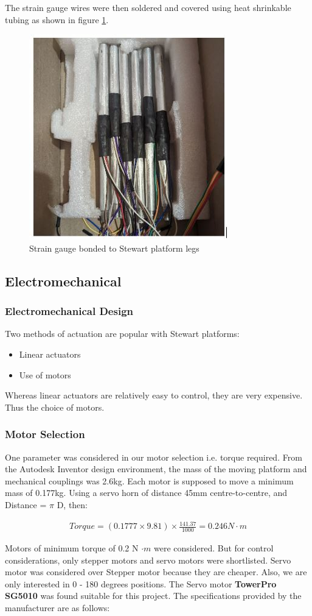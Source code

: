 The strain gauge wires were then soldered and covered using heat shrinkable tubing as shown in figure 
\ref{shrink}.
\begin{center}
	\begin{figure}[H]
	\centering
	\includegraphics[width=0.5\linewidth]{Figures/shrinkable1.JPG}
	\caption[Full assembly]{Strain gauge bonded to Stewart platform legs}
	\label{shrink}
	\end{figure}
\end{center}
\subsection{Electromechanical}
\subsubsection{Electromechanical Design}
Two methods of actuation are popular with Stewart platforms:
\begin{itemize}
\item Linear actuators
\item Use of motors
\end{itemize}
Whereas linear actuators are relatively easy to control, they are very expensive. Thus the choice of motors.
\subsubsection{Motor Selection}
One parameter was considered in our motor selection i.e. torque required. From the Autodesk Inventor 
design environment, the mass of the moving platform and mechanical couplings was 2.6kg. Each motor is 
supposed to move a minimum mass of 0.177kg. Using a servo horn of distance 45mm centre-to-centre, and 
Distance = $ \pi $ D, then:
\begin{ceqn}
\begin{align}
	Torque = (0.1777 \times 9.81)\times \frac{141.37}{1000} = 0.246 N\cdot m
\end{align}
\end{ceqn}
Motors of minimum torque of 0.2 N $\cdot m$ were considered. But for control considerations, only stepper 
motors and servo motors were shortlisted. Servo motor was considered over Stepper motor because they are cheaper. 
Also, we are only interested in 0 - 180 degrees positions.
The Servo motor \textbf{TowerPro SG5010} was found suitable for this project. The specifications provided by the manufacturer are as follows:


